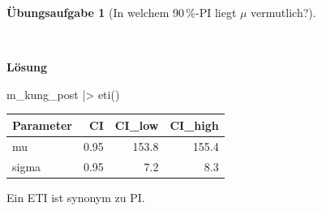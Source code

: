 \documentclass[
  ngerman,
  letterpaper,
  twoside,
  open=any]{scrbook}
\newenvironment{Shaded}{\begin{snugshade}}{\end{snugshade}}
\newcommand{\FunctionTok}[1]{\textcolor[rgb]{0.28,0.35,0.67}{#1}}
\newcommand{\NormalTok}[1]{\textcolor[rgb]{0.00,0.23,0.31}{#1}}
\newcommand{\SpecialCharTok}[1]{\textcolor[rgb]{0.37,0.37,0.37}{#1}}
\newcounter{none} %
\theoremstyle{definition}
\theoremstyle{plain}
\theoremstyle{definition}
\newtheorem{exercise}{Übungsaufgabe}[chapter]
\theoremstyle{definition}
\theoremstyle{definition}
\theoremstyle{definition}
\newtheorem{exercise}{Übungsaufgabe}[chapter]
\theoremstyle{remark}
\begin{document}
\begin{exercise}[In welchem 90\,\%-PI liegt \(\mu\)
vermutlich?]\protect\hypertarget{exr-kung4}{}\label{exr-kung4}

~

\begin{tcolorbox}[enhanced jigsaw, arc=.35mm, bottomrule=.15mm, breakable, colback=white, colframe=quarto-callout-tip-color-frame, left=2mm, leftrule=.75mm, opacityback=0, rightrule=.15mm, toprule=.15mm]

\vspace{-3mm}\textbf{Lösung}\vspace{3mm}

\begin{Shaded}
\begin{Highlighting}[]
\NormalTok{m\_kung\_post }\SpecialCharTok{|\textgreater{}} 
  \FunctionTok{eti}\NormalTok{()}
\end{Highlighting}
\end{Shaded}

{\def\LTcaptype{none} %
\begin{longtable}[]{@{}lrrr@{}}
\toprule\noalign{}
Parameter & CI & CI\_low & CI\_high \\
\midrule\noalign{}
\endhead
\bottomrule\noalign{}
\endlastfoot
mu & 0.95 & 153.8 & 155.4 \\
sigma & 0.95 & 7.2 & 8.3 \\
\end{longtable}
}

Ein ETI ist synonym zu PI.

\end{tcolorbox}

\end{exercise}
\end{document}
